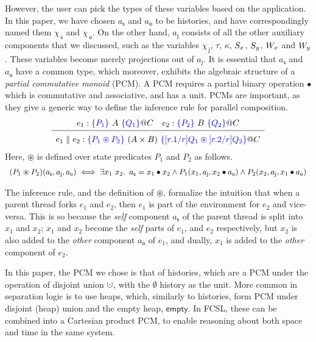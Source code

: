 \documentclass[a4paper,UKenglish]{lipics-v2016}
\newcounter{tags}
\newcommand{\specK}[1]{\ensuremath{\textcolor{blue}{#1}}}
\newcommand{\dotcup}{\ensuremath{\mathaccent\cdot\cup}}
\newcommand{\lcl}{{\mathsf{s}}}%
\newcommand{\env}{{\mathsf{o}}}%
\newcommand{\joint}{{\mathsf{j}}}%
\newcommand{\selfsub}{\mathsf{s}}
\newcommand{\othersub}{\mathsf{o}}
\newcommand{\jointsub}{\mathsf{j}}
\newcommand{\hist}{\chi}
\newcommand{\histS}{\hist_{\, \selfsub}}
\newcommand{\histO}{\hist_{\, \othersub}}
\newcommand{\histJ}{\hist_{\, \jointsub}}
\newcommand{\hempty}{\emptyset}
\newcommand{\hunion}{\mathbin{\dotcup}}
\newcommand{\ldot}{\mathord{.}\,}
\newcommand{\E}{\tau}
\newcommand{\C}{\kappa}
\theoremstyle{definition}
\begin{document}
However, the user can pick the types of these variables based on the
application. In this paper, we have chosen $a_\lcl$ and $a_\env$ to be
histories, and have correspondingly named them $\histS$ and $\histO$.
On the other hand, $a_\joint$ consists of all the other auxiliary
components that we discussed, such as the variables $\histJ$, $\E$,
$\C$, $S_x$, $S_y$, $W_x$ and $W_y$. These variables become merely
projections out of $a_\joint$.
%
It is essential that $a_\lcl$ and $a_\env$ have a common type, which
moreover, exhibits the algebraic structure of a \emph{partial
  commutative monoid} (PCM). A PCM requires a partial binary operation
$\bullet$ which is commutative and associative, and has a unit. 
%
%
PCMs are important, as they give a generic way to define the inference
rule for parallel composition.
%
\[
\hfill\begin{array}{c}
  e_1 : \specK{\{P_1\}}\ A\ \specK{\{Q_1\}} @ C \quad
  e_2 : \specK{\{P_2\}}\ B\ \specK{\{Q_2\}} @ C \\[2pt]
\hline\\[-7pt]
e_1 \parallel e_2 : \specK{\{P_1 \circledast P_2\}}\ (A \times B)\
\specK{\{[r.1/r]Q_1 \circledast [r.2/r]Q_2\}} @ C
\end{array}\hfill
\]
Here, $\circledast$ is defined over state predicates $P_1$ and $P_2$
as follows.
\[
\hfill\begin{array}{c}
  (P_1 \circledast P_2) (a_\lcl, a_\joint, a_\env) \iff
  \exists x_1~x_2\ldot\
  a_\lcl = x_1 \bullet x_2 \wedge
  P_1 (x_1, a_\joint, x_2 \bullet a_\env) \wedge
  P_2 (x_2, a_\joint, x_1 \bullet a_\env)
\end{array}\hfill
\]

The inference rule, and the definition of $\circledast$, formalize the
intuition that when a parent thread forks $e_1$ and $e_2$, then $e_1$
is part of the environment for $e_2$ and vice-versa. This is so
because the \emph{self} component $a_\lcl$ of the parent thread is
split into $x_1$ and $x_2$; $x_1$ and $x_2$ become the \emph{self}
parts of $e_1$, and $e_2$ respectively, but $x_2$ is also added to the
\emph{other} component $a_\env$ of $e_1$, and dually, $x_1$ is added
to the \emph{other} component of $e_2$.

In this paper, the PCM we chose is that of histories, which are a PCM
under the operation of disjoint union $\hunion$, with the $\hempty$
history as the unit. More common in separation logic is to use heaps,
which, similarly to histories, form PCM under disjoint (heap) union
and the empty heap, $\mathsf{empty}$. In FCSL, these can be combined
into a Cartesian product PCM, to enable reasoning about both space and
time in the same system.
\end{document}
